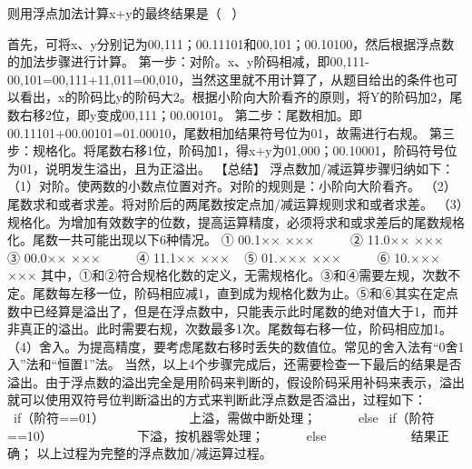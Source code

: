 则用浮点加法计算x+y的最终结果是（ ~）
\par{}
\begin{solution}首先，可将x、y分别记为00,111；00.11101和00,101；00.10100，然后根据浮点数的加法步骤进行计算。
第一步：对阶。x、y阶码相减，即00,111-00,101=00,111+11,011=00,010，当然这里就不用计算了，从题目给出的条件也可以看出，x的阶码比y的阶码大2。根据小阶向大阶看齐的原则，将Y的阶码加2，尾数右移2位，即y变成00,111；00.00101。
第二步：尾数相加。即00.11101+00.00101=01.00010，尾数相加结果符号位为01，故需进行右规。
第三步：规格化。将尾数右移1位，阶码加1，得x+y为01,000；00.10001，阶码符号位为01，说明发生溢出，且为正溢出。
【总结】 浮点数加/减运算步骤归纳如下：
（1）对阶。使两数的小数点位置对齐。对阶的规则是：小阶向大阶看齐。
（2）尾数求和或者求差。将对阶后的两尾数按定点加/减运算规则求和或者求差。
（3）规格化。为增加有效数字的位数，提高运算精度，必须将求和或求差后的尾数规格化。尾数一共可能出现以下6种情况。
① 00.1×× ××× ~ ~ ~ ② 11.0×× ××× ~ ③ 00.0×× ××× ~ ~ ~ ④ 11.1×× ××× ~ ⑤
01.××× ××× ~ ~ ~ ⑥ 10.××× ×××
其中，①和②符合规格化数的定义，无需规格化。③和④需要左规，次数不定。尾数每左移一位，阶码相应减1，直到成为规格化数为止。⑤和⑥其实在定点数中已经算是溢出了，但是在浮点数中，只能表示此时尾数的绝对值大于1，而并非真正的溢出。此时需要右规，次数最多1次。尾数每右移一位，阶码相应加1。
（4）舍入。为提高精度，要考虑尾数右移时丢失的数值位。常见的舍入法有``0舍1入''法和``恒置1''法。
当然，以上4个步骤完成后，还需要检查一下最后的结果是否溢出。由于浮点数的溢出完全是用阶码来判断的，假设阶码采用补码来表示，溢出就可以使用双符号位判断溢出的方式来判断此浮点数是否溢出，过程如下：
~ ~ ~ ~if（阶符==01） ~ ~ ~ ~ ~ ~ ~ ~上溢，需做中断处理； ~ ~ ~ ~else
~if（阶符==10） ~ ~ ~ ~ ~ ~ ~ ~下溢，按机器零处理； ~ ~ ~ ~else ~ ~ ~ ~
~ ~ ~ ~结果正确； 以上过程为完整的浮点数加/减运算过程。
\end{solution}
